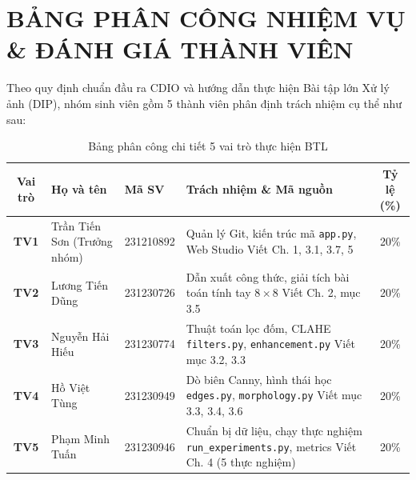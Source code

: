\documentclass[12pt,a4paper]{report}
\begin{document}
\newpage
{}
\section*{BẢNG PHÂN CÔNG NHIỆM VỤ \& ĐÁNH GIÁ THÀNH VIÊN}

Theo quy định chuẩn đầu ra CDIO và hướng dẫn thực hiện Bài tập lớn Xử lý ảnh (DIP), nhóm sinh viên gồm 5 thành viên phân định trách nhiệm cụ thể như sau:

\begin{table}[H]
\centering
\small
\begin{tabularx}{\textwidth}{|c|X|l|X|c|}
\hline
\textbf{Vai trò} & \textbf{Họ và tên} & \textbf{Mã SV} & \textbf{Trách nhiệm \& Mã nguồn} & \textbf{Tỷ lệ (\%)} \\
\hline
\textbf{TV1} & Trần Tiến Sơn \newline (Trưởng nhóm) & 231210892 & Quản lý Git, kiến trúc mã \newline \texttt{app.py}, Web Studio \newline Viết Ch. 1, 3.1, 3.7, 5 & 20\% \\
\hline
\textbf{TV2} & Lương Tiến Dũng & 231230726 & Dẫn xuất công thức, giải tích \newline 5 bài toán tính tay $8\times 8$ \newline Viết Ch. 2, mục 3.5 & 20\% \\
\hline
\textbf{TV3} & Nguyễn Hải Hiếu & 231230774 & Thuật toán lọc đốm, CLAHE \newline \texttt{filters.py}, \texttt{enhancement.py} \newline Viết mục 3.2, 3.3 & 20\% \\
\hline
\textbf{TV4} & Hồ Việt Tùng & 231230949 & Dò biên Canny, hình thái học \newline \texttt{edges.py}, \texttt{morphology.py} \newline Viết mục 3.3, 3.4, 3.6 & 20\% \\
\hline
\textbf{TV5} & Phạm Minh Tuấn & 231230946 & Chuẩn bị dữ liệu, chạy thực nghiệm \newline \texttt{run\_experiments.py}, metrics \newline Viết Ch. 4 (5 thực nghiệm) & 20\% \\
\hline
\end{tabularx}
\caption{Bảng phân công chi tiết 5 vai trò thực hiện BTL}
\end{table}
\end{document}
